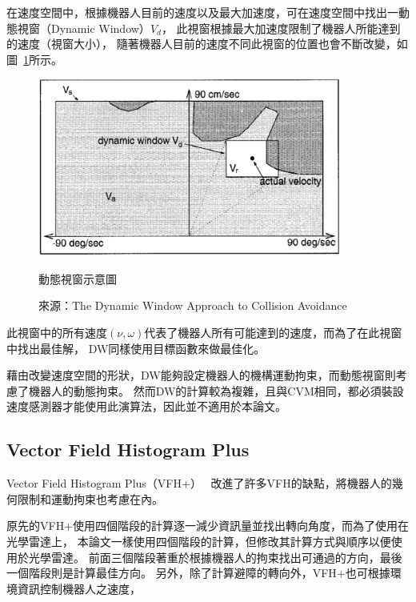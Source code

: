 在速度空間中，根據機器人目前的速度以及最大加速度，可在速度空間中找出一動態視窗（Dynamic Window）$V_d$，
此視窗根據最大加速度限制了機器人所能達到的速度（視窗大小），
隨著機器人目前的速度不同此視窗的位置也會不斷改變，如圖~\ref{f:dynamic_window}所示。
\begin{figure}[h!]
	\centering
	\includegraphics[width=10cm]{figures/dynamic_window}
	\caption{動態視窗示意圖}
	\caption*{來源：The Dynamic Window Approach to Collision Avoidance}
	\label{f:dynamic_window}
\end{figure}
此視窗中的所有速度$(\nu,\omega)$代表了機器人所有可能達到的速度，而為了在此視窗中找出最佳解，
DW同樣使用目標函數來做最佳化。

藉由改變速度空間的形狀，DW能夠設定機器人的機構運動拘束，而動態視窗則考慮了機器人的動態拘束。
然而DW的計算較為複雜，且與CVM相同，都必須裝設速度感測器才能使用此演算法，因此並不適用於本論文。

\subsection{Vector Field Histogram Plus}
Vector Field Histogram Plus（VFH+）~\cite{Ulrich:1998:VFHPlus}
改進了許多VFH的缺點，將機器人的幾何限制和運動拘束也考慮在內。

原先的VFH+使用四個階段的計算逐一減少資訊量並找出轉向角度，而為了使用在光學雷達上，
本論文一樣使用四個階段的計算，但修改其計算方式與順序以便使用於光學雷達。
前面三個階段著重於根據機器人的拘束找出可通過的方向，最後一個階段則是計算最佳方向。
另外，除了計算避障的轉向外，VFH+也可根據環境資訊控制機器人之速度，

